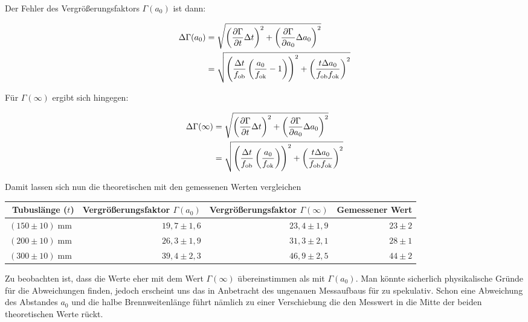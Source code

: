 \documentclass[a4paper,german,12pt,smallheadings]{scrartcl}
\begin{document}
Der Fehler des Vergrößerungsfaktors $\Gamma(a_0)$ ist dann:

\begin{align*}
  \Delta \Gamma(a_0) &= \sqrt{
    \del{\frac{\partial \Gamma}{\partial t} \Delta t}^2 +
    \del{\frac{\partial \Gamma}{\partial a_0} \Delta a_0}^2
  } \\
  &= \sqrt{
    \del{
      \frac{\Delta t}{f_\text{ob}} \del{
        \frac{a_0}{f_\text{ok}} - 1
      }
    }^2 +
    \del{
      \frac{t \Delta a_0}{f_\text{ob} f_\text{ok}}
    }^2
  }
\end{align*}

Für $\Gamma(\infty)$ ergibt sich hingegen:

\begin{align*}
  \Delta \Gamma(\infty) &= \sqrt{
    \del{\frac{\partial \Gamma}{\partial t} \Delta t}^2 +
    \del{\frac{\partial \Gamma}{\partial a_0} \Delta a_0}^2
  } \\
  &= \sqrt{
    \del{
      \frac{\Delta t}{f_\text{ob}} \del{
        \frac{a_0}{f_\text{ok}}
      }
    }^2 +
    \del{
      \frac{t \Delta a_0}{f_\text{ob} f_\text{ok}}
    }^2
  }
\end{align*}

Damit lassen sich nun die theoretischen mit den gemessenen Werten vergleichen

\hspace{5 mm}

\begin{tabular}{ r | r | r | r}
  Tubuslänge ($t$) & Vergrößerungsfaktor $\Gamma(a_0)$ & Vergrößerungsfaktor $\Gamma(\infty)$ & Gemessener Wert \\
  \hline
  $(150\pm10) \operatorname{mm}$ & $19{,}7\pm1{,}6$ & $23{,}4\pm1{,}9$ & $23\pm2$ \\
  $(200\pm10) \operatorname{mm}$ & $26{,}3\pm1{,}9$ & $31{,}3\pm2{,}1$ & $28\pm1$ \\
  $(300\pm10) \operatorname{mm}$ & $39{,}4\pm2{,}3$ & $46{,}9\pm2{,}5$ & $44\pm2$ \\
\end{tabular}

\hspace{5mm}

Zu beobachten ist, dass die Werte eher mit dem Wert $\Gamma(\infty)$
übereinstimmen als mit $\Gamma(a_0)$. Man könnte sicherlich physikalische
Gründe für die Abweichungen finden, jedoch erscheint uns das in Anbetracht
des ungenauen Messaufbaus für zu spekulativ. Schon eine Abweichung des
Abstandes $a_0$ und die halbe Brennweitenlänge führt nämlich zu einer
Verschiebung die den Messwert in die Mitte der beiden theoretischen Werte
rückt.
\end{document}
